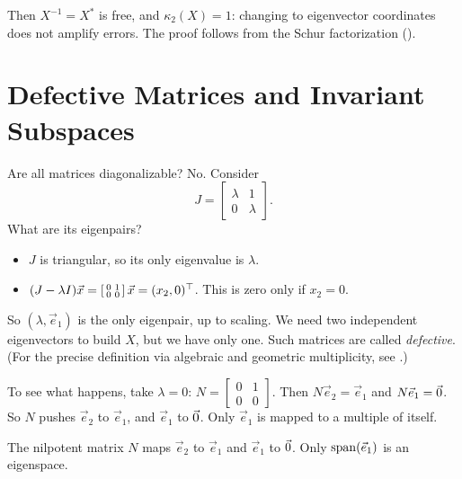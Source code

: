 Then $X^{-1} = X^\ast$ is free, and $\kappa_2(X) = 1$: changing to eigenvector coordinates does not amplify errors. The proof follows from the Schur factorization ().

\section{Defective Matrices and Invariant Subspaces}
\label{sec:defective}

Are all matrices diagonalizable? No. Consider
\begin{equation}
  J = \begin{bmatrix} \lambda & 1 \\ 0 & \lambda \end{bmatrix}.
\end{equation}
What are its eigenpairs?
\begin{itemize}
  \item $J$ is triangular, so its only eigenvalue is $\lambda$.
  \item $(J - \lambda I)\vec{x} = \left[\begin{smallmatrix} 0 & 1 \\ 0 & 0 \end{smallmatrix}\right]\vec{x} = (x_2, 0)^\top$. This is zero only if $x_2 = 0$.
\end{itemize}
So $(\lambda, \vec{e}_1)$ is the only eigenpair, up to scaling. We need two independent eigenvectors to build $X$, but we have only one. Such matrices are called \emph{defective}. (For the precise definition via algebraic and geometric multiplicity, see .)

To see what happens, take $\lambda = 0$: $N = \left[\begin{smallmatrix} 0 & 1 \\ 0 & 0 \end{smallmatrix}\right]$. Then $N\vec{e}_2 = \vec{e}_1$ and $N\vec{e}_1 = \vec{0}$. So $N$ pushes $\vec{e}_2$ to $\vec{e}_1$, and $\vec{e}_1$ to $\vec{0}$. Only $\vec{e}_1$ is mapped to a multiple of itself.

\begin{center}

\small The nilpotent matrix $N$ maps $\vec{e}_2$ to $\vec{e}_1$ and $\vec{e}_1$ to $\vec{0}$. Only $\operatorname{span}(\vec{e}_1)$ is an eigenspace.
\end{center}


